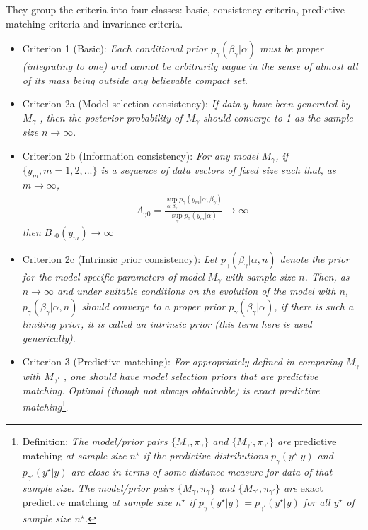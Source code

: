 \documentclass[11 pt]{article}
\begin{document}
\begin{multicols}{2}
They group the criteria into four classes: basic, consistency criteria, predictive matching criteria and invariance criteria.
\begin{itemize}[label={}]
    \item Criterion 1 (Basic): \textit{Each conditional prior $p_\gamma(\beta_\gamma|\alpha)$ must be proper (integrating to one) and cannot be arbitrarily vague in the sense of almost all of its mass being outside any believable compact set}.
    \item Criterion 2a (Model selection consistency): \textit{If data $y$ have been generated by $M_\gamma$ , then the posterior probability of $M_\gamma$ should converge to 1 as the sample size $n\to\infty$}.
    \item Criterion 2b (Information consistency): \textit{For any model $M_\gamma$, if $\{y_m, m = 1, 2,... \}$ is a sequence of data vectors of fixed size such that, as $m\to\infty$,} 
    \begin{align*}
        \Lambda_{\gamma0}=\frac{\sup_{\alpha,\beta_\gamma} p_\gamma(y_m|\alpha,\beta_\gamma) }{\sup_\alpha p_0(y_m|\alpha)} \to \infty
    \end{align*}
    \textit{then} $B_{\gamma0}(y_m)\to \infty$
    \item Criterion 2c (Intrinsic prior consistency): \textit{Let $p_\gamma(\beta_\gamma|\alpha,n)$ denote the prior for the model specific parameters of model $M_\gamma$ with sample size $n$. Then, as $n\to\infty$ and under suitable conditions on the evolution of the model with $n$, $p_\gamma(\beta_\gamma|\alpha,n)$ should converge to a proper prior $p_\gamma(\beta_\gamma|\alpha)$, if there is such a limiting prior, it is called an intrinsic prior (this term here is used generically)}.
    \item Criterion 3 (Predictive matching): \textit{For appropriately defined  in comparing $M_\gamma$ with $M_{\gamma'}$ , one should have model selection priors that are predictive matching. Optimal (though not always obtainable) is exact predictive matching}\footnote{Definition: \textit{The model/prior pairs $\{M_\gamma,\pi_\gamma\}$ and $\{M_{\gamma'},\pi_{\gamma'}\}$ are} predictive matching \textit{at sample size $n^\star$ if the predictive distributions $p_\gamma(y^\star|y)$ and $p_{\gamma'}(y^\star|y)$ are close in terms of some distance measure for data of that sample size. The model/prior pairs $\{M_\gamma,\pi_\gamma\}$ and $\{M_{\gamma'},\pi_{\gamma'}\}$ are} exact predictive matching \textit{at sample size $n^\star$ if $p_\gamma(y^\star|y) = p_{\gamma'}(y^\star|y)$ for all $y^\star$ of sample size $n^\star$.}}.

\end{itemize}
\end{multicols}
\end{document}
